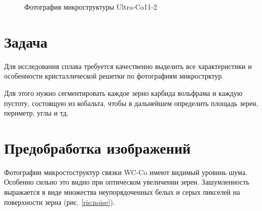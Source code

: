 \documentclass[a4paper, 14pt]{article}
\begin{document}
	\begin{figure}[h]
		\caption{Фотография микроструктуры Ultra-Co11-2}
		\label{fig:original}
	\end{figure}


	\section{Задача}
	
	Для исследования сплава требуется качественно выделить все характеристики и особенности 
	кристаллической решетки по фотографиям микрострктур. 
	
	Для этого нужно сегментировать каждое зерно карбида вольфрама и каждую пустоту, состоящую из кобальта, чтобы в дальнейшем определить площадь зерен, периметр, углы и тд. 
	

	\section{Предобработка изображений}
	
	Фотографии микростоструктур связки WC-Co имеют видимый уровннь шума. Особенно сильно 
	это видно при оптическом увеличении зерен. Зашумленность выражается в виде 
	множества неупорядоченных белых и серых пикселей на поверхности зерна (рис. \ref{ris:noise}). 
	
\end{document}
